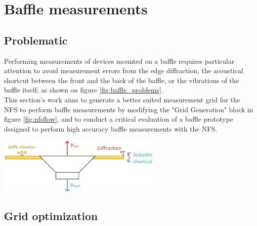 \documentclass{report}
\begin{document}
\chapter{Baffle measurements}

\section{Problematic}

Performing measurements of devices mounted on a baffle requires particular attention to avoid measurement errors from the edge diffraction, the acoustical shortcut between the front and the back of the baffle, or the vibrations of the baffle itself; as shown on figure \ref{fig:baffle_problems}. \\
This section's work aims to generate a better suited measurement grid for the NFS to perform baffle measurements by modifying the "Grid Generation" block in figure \ref{fig:nfsflow}, and to conduct a critical evaluation of a baffle prototype designed to perform high accuracy baffle measurements with the NFS. 

\begin{center}
	\includegraphics[width=0.6\textwidth]{GridOpti/baffle_problems} 
    \captionsetup{hypcap=false} 
	\label{fig:baffle_problems}
\end{center}



\section{Grid optimization}
\end{document}
